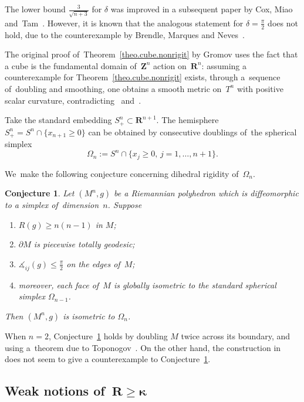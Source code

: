 \documentclass[10pt,a4paper]{amsart}
\numberwithin{equation}{section}
\newtheorem{conj}[prop]{Conjecture}
\theoremstyle{definition}
\newcommand{\RR}{\mathbf{R}}
\newcommand{\ZZ}{\mathbf{Z}}
\begin{document}
The lower bound $\frac{3}{\sqrt{n+3}}$ for $\delta$ was improved in a subsequent paper by Cox, Miao and~Tam~\cite{CoxMiaoTam2013remarks}. However, it is known that the analogous statement for $\delta=\frac{\pi}{2}$ does not hold, due to the counterexample by Brendle, Marques and Neves~\cite{Brendle2011deformation}.

The original proof of~Theorem~\ref{theo.cube.nonrigit} by Gromov uses the fact that a cube is the fundamental domain of~$\ZZ^n$ action on~$\RR^n$: assuming a counterexample for Theorem~\ref{theo.cube.nonrigit} exists, through a~sequence of~doubling and smoothing, one obtains a smooth metric on~$T^n$ with positive scalar curvature, contradicting~\cite{GromovLawson1980Spin} and~\cite{SchoenYau1979structure}.

Take the standard embedding $S^n_+\subset\RR^{n+1}$. The hemisphere $S^n_+=S^n\cap \{x_{n+1}\ge 0\}$ can be obtained by consecutive doublings of~the spherical simplex\vspace{-.5ex}
\[
\Omega_n:=S^n\cap \{x_j\ge 0,\, j=1,\dots,n+1\}.
\]

We~make the following conjecture concerning dihedral rigidity of~$\Omega_n$.

\begin{conj}\label{conj.spherical.simplex}
Let $(M^n,g)$ be a Riemannian polyhedron which is diffeomorphic to a simplex of~dimension~$n$. Suppose\vspace{-.5ex}
\begin{enumerate}\itemsep=0pt
\item[${\rm 1)}$] $R(g)\ge n(n-1)$ in $M$;
\item[${\rm 2)}$] $\partial M$ is piecewise totally geodesic;
\item[${\rm 3)}$] $\measuredangle_{ij}(g)\le \frac{\pi}{2}$ on the edges of~$M$;
\item[${\rm 4)}$] moreover, each face of~$M$ is globally isometric to the standard spherical simplex $\Omega_{n-1}$.
\end{enumerate}
Then $(M^n,g)$ is isometric to $\Omega_n$.
\end{conj}

When $n=2$, Conjecture~\ref{conj.spherical.simplex} holds by doubling $M$ twice across its boundary, and using a~theorem due to Toponogov~\cite{Toponogov1959evaluation}. On the other hand, the construction in~\cite{Brendle2011deformation} does not seem to give a counterexample to Conjecture~\ref{conj.spherical.simplex}.

\subsection[Weak notions of $R \ge \kappa$]{Weak notions of~$\boldsymbol{R\ge \kappa}$}
\end{document}
